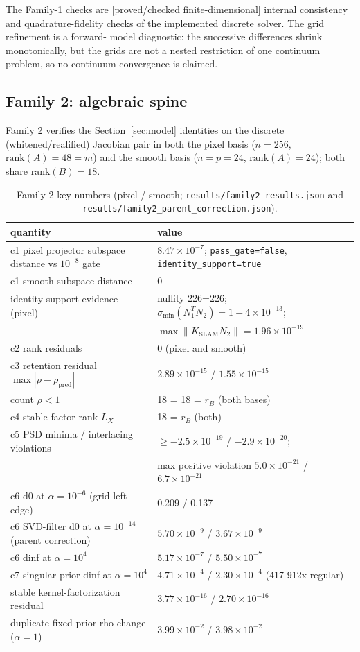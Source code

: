 \documentclass[12pt]{article}
\newcommand{\FDL}{\textnormal{[proved/checked finite-dimensional]}}
\begin{document}
The Family-1 checks are \FDL{} internal consistency and quadrature-fidelity
checks of the implemented discrete solver. The grid refinement is a forward-
model diagnostic: the successive differences shrink monotonically, but the
grids are not a nested restriction of one continuum problem, so no continuum
convergence is claimed.

\subsection{Family 2: algebraic spine}\label{sec:family2}

Family 2 verifies the Section~\ref{sec:model} identities on the discrete
(whitened/realified) Jacobian pair in both the pixel basis
($n=256$, $\mathrm{rank}(A)=48=m$) and the smooth basis ($n=p=24$,
$\mathrm{rank}(A)=24$); both share $\mathrm{rank}(B)=18$.

\begin{table}[ht]
\centering
\small
\caption{Family 2 key numbers (pixel / smooth; \texttt{results/family2\_results.json}
and \texttt{results/family2\_parent\_correction.json}).}
\label{tab:f2}
\begin{tabular}{l l}
\toprule
quantity & value \\
\midrule
c1 pixel projector subspace distance vs $10^{-8}$ gate &
$8.47\times10^{-7}$; \texttt{pass\_gate=false}, \texttt{identity\_support=true} \\
c1 smooth subspace distance & 0 \\
identity-support evidence (pixel) &
nullity 226=226; $\sigma_{\min}(N_1^TN_2)=1-4\times10^{-13}$; \\
 & $\max\|K_{\mathrm{SLAM}}N_2\|=1.96\times10^{-19}$ \\
c2 rank residuals & 0 (pixel and smooth) \\
c3 retention residual $\max|\rho-\rho_{\mathrm{pred}}|$ &
$2.89\times10^{-15}$ / $1.55\times10^{-15}$ \\
count $\rho<1$ & 18 = 18 = $r_B$ (both bases) \\
c4 stable-factor rank $L_X$ & 18 = $r_B$ (both) \\
c5 PSD minima / interlacing violations &
$\ge -2.5\times10^{-19}$ / $-2.9\times10^{-20}$; \\
 & max positive violation $5.0\times10^{-21}$ / $6.7\times10^{-21}$ \\
c6 d0 at $\alpha=10^{-6}$ (grid left edge) & 0.209 / 0.137 \\
c6 SVD-filter d0 at $\alpha=10^{-14}$ (parent correction) &
$5.70\times10^{-9}$ / $3.67\times10^{-9}$ \\
c6 dinf at $\alpha=10^{4}$ & $5.17\times10^{-7}$ / $5.50\times10^{-7}$ \\
c7 singular-prior dinf at $\alpha=10^{4}$ &
$4.71\times10^{-4}$ / $2.30\times10^{-4}$ (417-912x regular) \\
stable kernel-factorization residual &
$3.77\times10^{-16}$ / $2.70\times10^{-16}$ \\
duplicate fixed-prior rho change ($\alpha=1$) &
$3.99\times10^{-2}$ / $3.98\times10^{-2}$ \\
\bottomrule
\end{tabular}
\end{table}
\end{document}
